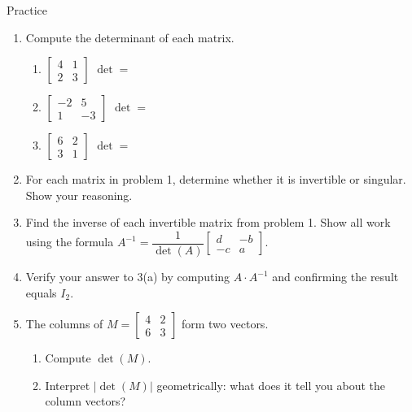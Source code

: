 \documentclass[10pt]{article}
\begin{document}
\namedateperiod

\vspace{0.1in}

\begin{notesbox}{Practice}
\begin{enumerate}[leftmargin=1.5em, itemsep=6pt]

    \item Compute the determinant of each matrix.
    \begin{enumerate}[label=(\alph*), leftmargin=1.5em, itemsep=10pt]
        \item $\begin{bmatrix}4&1\\2&3\end{bmatrix}$ \hfill $\det = $ \blank{3cm}

        \item $\begin{bmatrix}-2&5\\1&-3\end{bmatrix}$ \hfill $\det = $ \blank{3cm}

        \item $\begin{bmatrix}6&2\\3&1\end{bmatrix}$ \hfill $\det = $ \blank{3cm}
    \end{enumerate}
    \vspace{0.1in}

    \item For each matrix in problem 1, determine whether it is invertible or singular.
          Show your reasoning.
          \vspace{0.5in}

    \item Find the inverse of each invertible matrix from problem 1.
          Show all work using the formula $A^{-1} = \dfrac{1}{\det(A)}\begin{bmatrix}d&-b\\-c&a\end{bmatrix}$.
          \vspace{1.4in}

    \item Verify your answer to 3(a) by computing $A \cdot A^{-1}$ and confirming the result
          equals $I_2$.
          \vspace{1.0in}

    \item The columns of $M = \begin{bmatrix}4&2\\6&3\end{bmatrix}$ form two vectors.
    \begin{enumerate}[label=(\alph*), leftmargin=1.5em, itemsep=10pt]
        \item Compute $\det(M)$.
              \vspace{0.4in}
        \item Interpret $|\det(M)|$ geometrically: what does it tell you about the column vectors?
              \writeline
              \writeline
    \end{enumerate}


\end{enumerate}
\end{notesbox}
\end{document}
